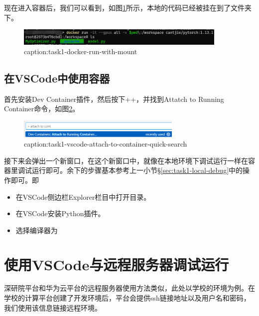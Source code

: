 现在进入容器后，我们可以看到，如图\ref{fig:task1-docker-run-with-mount}所示，本地的代码已经被挂在到了\graylstinline{\workspace}文件夹下。
\begin{figure}[htbp]
	\centering
	\includegraphics[width=0.9\textwidth]{figures/task1-docker-run-with-mount.png}
	\caption{caption:task1-docker-run-with-mount}
	\label{fig:task1-docker-run-with-mount}
\end{figure}

\subsection{在VSCode中使用容器}

首先安装Dev Container插件，然后按下++，并找到Attatch to Running Container命令，如图\ref{fig:task1-vscode-attach-to-container-quick-search}。
\begin{figure}[htbp]
	\centering
	\includegraphics[width=0.7\textwidth]{figures/task1-vscode-attach-to-container-quick-search.png}
	\caption{caption:task1-vscode-attach-to-container-quick-search}
	\label{fig:task1-vscode-attach-to-container-quick-search}
\end{figure}

接下来会弹出一个新窗口，在这个新窗口中，就像在本地环境下调试运行一样在容器里调试运行即可。余下的步骤基本参考上一小节\S\ref{sec:task1-local-debug}中的操作即可。即
\begin{itemize}
    \item 在VSCode侧边栏Explorer栏目中打开目录。
    \item 在VSCode安装Python插件。
    \item 选择编译器为
\end{itemize}

\section{使用VSCode与远程服务器调试运行}

深研院平台和华为云平台的远程服务器使用方法类似，此处以学校的环境为例。在学校的计算平台创建了开发环境后，平台会提供ssh链接地址以及用户名和密码，我们使用该信息链接远程环境。

